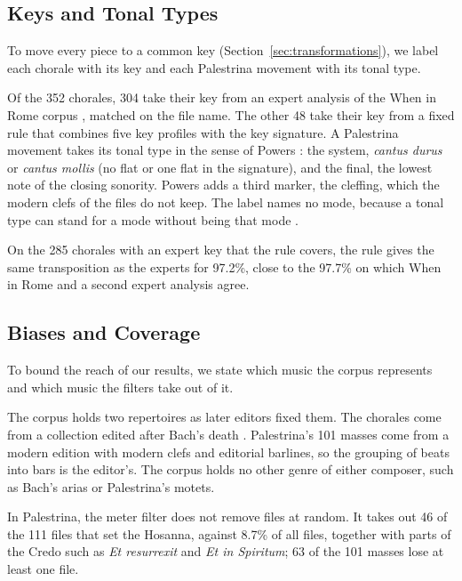 \subsection{Keys and Tonal Types}
\label{sec:keys}

To move every piece to a common key (Section~\ref{sec:transformations}), we label each chorale with its key and each Palestrina movement with its tonal type.

Of the 352 chorales, 304 take their key from an expert analysis of the When in Rome corpus \cite{gotham2023, gotham2026wir}, matched on the file name. The other 48 take their key from a fixed rule that combines five key profiles with the key signature. A Palestrina movement takes its tonal type in the sense of Powers \cite{powers1981}: the system, \emph{cantus durus} or \emph{cantus mollis} (no flat or one flat in the signature), and the final, the lowest note of the closing sonority. Powers adds a third marker, the cleffing, which the modern clefs of the files do not keep. The label names no mode, because a tonal type can stand for a mode without being that mode \cite{powers1981, mangani2025}.

On the 285 chorales with an expert key that the rule covers, the rule gives the same transposition as the experts for 97.2\%, close to the 97.7\% on which When in Rome and a second expert analysis \cite{sears2023} agree.

\subsection{Biases and Coverage}

To bound the reach of our results, we state which music the corpus represents and which music the filters take out of it.

The corpus holds two repertoires as later editors fixed them. The chorales come from a collection edited after Bach's death \cite{dahn2018}. Palestrina's 101 masses come from a modern edition with modern clefs and editorial barlines, so the grouping of beats into bars is the editor's. The corpus holds no other genre of either composer, such as Bach's arias or Palestrina's motets.

In Palestrina, the meter filter does not remove files at random. It takes out 46 of the 111 files that set the Hosanna, against 8.7\% of all files, together with parts of the Credo such as \emph{Et resurrexit} and \emph{Et in Spiritum}; 63 of the 101 masses lose at least one file.

